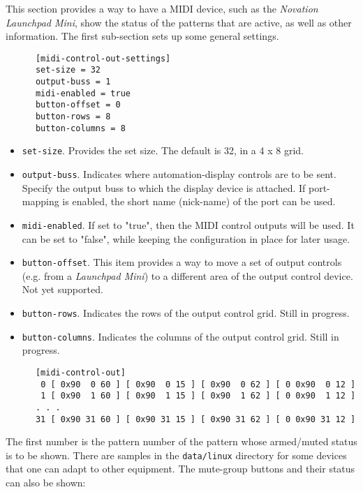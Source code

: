    This section provides a way to have a MIDI device, such as the
   \textsl{Novation Launchpad Mini}, show the status
   of the patterns that are active, as well as other information.
   The first sub-section sets up some general settings.

   \begin{verbatim}
      [midi-control-out-settings]
      set-size = 32
      output-buss = 1
      midi-enabled = true
      button-offset = 0
      button-rows = 8
      button-columns = 8
   \end{verbatim}

   \begin{itemize}
      \item \texttt{set-size}.
         Provides the set size.  The default is 32, in a 4 x 8 grid.
      \item \texttt{output-buss}.
         Indicates where automation-display controls are to be sent.
         Specify the output buss to which the display device is attached. If
         port-mapping is enabled, the short name (nick-name) of the port can be
         used.
      \item \texttt{midi-enabled}.
         If set to "true", then the MIDI control outputs will be used.
         It can be set to "false", while keeping the configuration in place
         for later usage.
      \item \texttt{button-offset}.
         This item provides a way to move a set of output controls (e.g. from a
         \textsl{Launchpad Mini}) to a different area of the output control
         device.  Not yet supported.
      \item \texttt{button-rows}.
         Indicates the rows of the output control grid.
         Still in progress.
      \item \texttt{button-columns}.
         Indicates the columns of the output control grid.
         Still in progress.
   \end{itemize}

   \begin{verbatim}
      [midi-control-out]
       0 [ 0x90  0 60 ] [ 0x90  0 15 ] [ 0x90  0 62 ] [ 0 0x90  0 12 ]
       1 [ 0x90  1 60 ] [ 0x90  1 15 ] [ 0x90  1 62 ] [ 0 0x90  1 12 ]
      . . .
      31 [ 0x90 31 60 ] [ 0x90 31 15 ] [ 0x90 31 62 ] [ 0 0x90 31 12 ]
   \end{verbatim}

   The first number is the pattern number of the pattern whose armed/muted
   status is to be shown.
   There are samples in the \texttt{data/linux} directory for some devices that
   one can adapt to other equipment.
   The mute-group buttons and their status can also be shown:

